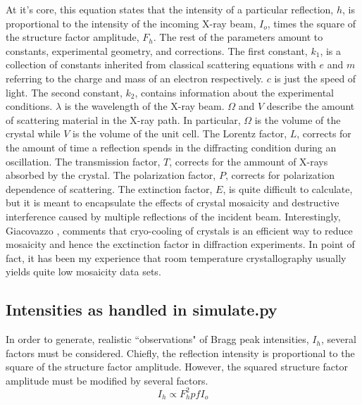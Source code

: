\documentclass{report}
\begin{document}
At it's core, this equation states that the intensity of a particular reflection, $h$, is proportional to the intensity of the incoming X-ray beam, $I_o$, times the square of the structure factor amplitude, $F_h$. 
The rest of the parameters amount to constants, experimental geometry, and corrections. 
The first constant, $k_1$, is a collection of constants inherited from classical scattering equations with $e$ and $m$ referring to the charge and mass of an electron respectively. $c$ is just the speed of light. 
The second constant, $k_2$, contains information about the experimental conditions. $\lambda$ is the wavelength of the X-ray beam. $\Omega$ and $V$ describe the amount of scattering material in the X-ray path. In particular, $\Omega$ is the volume of the crystal while $V$ is the volume of the unit cell. 
The Lorentz factor, $L$, corrects for the amount of time a reflection spends in the diffracting condition during an oscillation. 
The transmission factor, $T$, corrects for the ammount of X-rays absorbed by the crystal. 
The polarization factor, $P$, corrects for polarization dependence of scattering. 
The extinction factor, $E$, is quite difficult to calculate, but it is meant to encapsulate the effects of crystal mosaicity and destructive interference caused by multiple reflections of the incident beam. Interestingly, Giacovazzo \cite{Giacovazzo2011-wp}, comments that cryo-cooling of crystals is an efficient way to reduce mosaicity and hence the exctinction factor in diffraction experiments. In point of fact, it has been my experience that room temperature crystallography usually yields quite low mosaicity data sets. 


\subsection{Intensities as handled in simulate.py}
In order to generate, realistic ``observations" of Bragg peak intensities, $I_h$, several factors must be considered. 
Chiefly, the reflection intensity is proportional to the square of the structure factor amplitude. 
However, the squared structure factor amplitude must be modified by several factors. 
\begin{equation}
I_h \propto F_h^2pfI_o
\end{equation}
\end{document}

